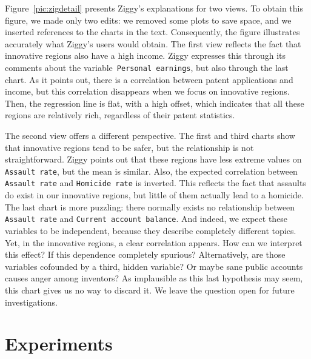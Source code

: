 Figure~\ref{pic:zigdetail} presents Ziggy's explanations for two views. To
obtain this figure, we made only two edits: we removed some plots to save
space, and we inserted references to the charts in the text. Consequently, the
figure illustrates accurately what Ziggy's users would obtain. The first view
reflects the fact that innovative regions also have a high income. Ziggy
expresses this through its comments about the
variable~\texttt{Personal earnings}, but also through the last chart. As it
points out, there is a correlation between patent applications and income, but
this correlation disappears when we focus on innovative regions. Then, the
regression line is flat, with a high offset, which indicates that all these
regions are relatively rich, regardless of their patent statistics.

The second view offers a different perspective. The first and third charts show
that innovative regions tend to be safer, but the relationship is not
straightforward. Ziggy points out that these regions have less extreme values
on \texttt{Assault rate}, but the mean is similar. Also, the expected
correlation between \texttt{Assault rate} and \texttt{Homicide rate} is
inverted. This reflects the fact that assaults do exist in our innovative
regions, but little of them actually lead to a homicide. The last chart is more
puzzling: there normally exists no relationship between \texttt{Assault rate}
and \texttt{Current ac\-count balance}. And indeed, we expect these variables
to be independent, because they describe completely different topics. Yet,
in the innovative regions, a clear correlation appears. How can we interpret
this effect? If this dependence completely spurious? Alternatively, are those
variables cofounded by a third, hidden variable? Or maybe sane public accounts
causes anger among inventors? As implausible as this last hypothesis may seem, this
chart gives us no way to discard it. We leave the question open for future
investigations.

\section{Experiments}
\label{sec:experiments}



